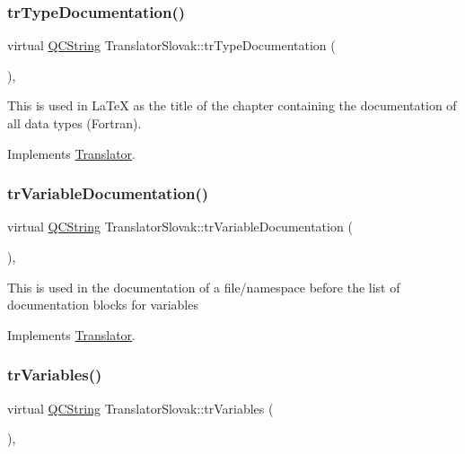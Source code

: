 \subsubsection{\texorpdfstring{trTypeDocumentation()}{trTypeDocumentation()}}
{\footnotesize\ttfamily virtual \mbox{\hyperlink{class_q_c_string}{Q\+C\+String}} Translator\+Slovak\+::tr\+Type\+Documentation (\begin{DoxyParamCaption}{ }\end{DoxyParamCaption})\hspace{0.3cm}{\ttfamily [inline]}, {\ttfamily [virtual]}}

This is used in La\+TeX as the title of the chapter containing the documentation of all data types (Fortran). 

Implements \mbox{\hyperlink{class_translator}{Translator}}.

\mbox{\label{class_translator_slovak_a6db137f751aa80cde89048d3dfa69d1e}} 
\subsubsection{\texorpdfstring{trVariableDocumentation()}{trVariableDocumentation()}}
{\footnotesize\ttfamily virtual \mbox{\hyperlink{class_q_c_string}{Q\+C\+String}} Translator\+Slovak\+::tr\+Variable\+Documentation (\begin{DoxyParamCaption}{ }\end{DoxyParamCaption})\hspace{0.3cm}{\ttfamily [inline]}, {\ttfamily [virtual]}}

This is used in the documentation of a file/namespace before the list of documentation blocks for variables 

Implements \mbox{\hyperlink{class_translator}{Translator}}.

\mbox{\label{class_translator_slovak_a506898cbad54130200ec994c6b41901f}} 
\subsubsection{\texorpdfstring{trVariables()}{trVariables()}}
{\footnotesize\ttfamily virtual \mbox{\hyperlink{class_q_c_string}{Q\+C\+String}} Translator\+Slovak\+::tr\+Variables (\begin{DoxyParamCaption}{ }\end{DoxyParamCaption})\hspace{0.3cm}{\ttfamily [inline]}, {\ttfamily [virtual]}}

